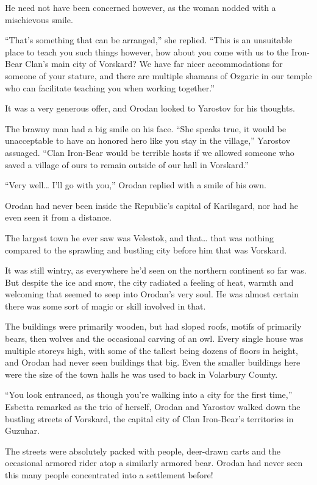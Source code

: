 \documentclass[a4paper,10pt]{book}
\begin{document}
He need not have been concerned however, as the woman nodded with a mischievous smile.\par
“That’s something that can be arranged,” she replied. “This is an unsuitable place to teach you such things however, how about you come with us to the Iron-Bear Clan’s main city of Vorskard? We have far nicer accommodations for someone of your stature, and there are multiple shamans of Ozgaric in our temple who can facilitate teaching you when working together.”\par
It was a very generous offer, and Orodan looked to Yarostov for his thoughts.\par
The brawny man had a big smile on his face. “She speaks true, it would be unacceptable to have an honored hero like you stay in the village,” Yarostov assuaged. “Clan Iron-Bear would be terrible hosts if we allowed someone who saved a village of ours to remain outside of our hall in Vorskard.”\par
“Very well… I’ll go with you,” Orodan replied with a smile of his own.\par
\par
Orodan had never been inside the Republic’s capital of Karilsgard, nor had he even seen it from a distance.\par
The largest town he ever saw was Velestok, and that… that was nothing compared to the sprawling and bustling city before him that was Vorskard.\par
It was still wintry, as everywhere he’d seen on the northern continent so far was. But despite the ice and snow, the city radiated a feeling of heat, warmth and welcoming that seemed to seep into Orodan’s very soul. He was almost certain there was some sort of magic or skill involved in that.\par
The buildings were primarily wooden, but had sloped roofs, motifs of primarily bears, then wolves and the occasional carving of an owl. Every single house was multiple storeys high, with some of the tallest being dozens of floors in height, and Orodan had never seen buildings that big. Even the smaller buildings here were the size of the town halls he was used to back in Volarbury County.\par
“You look entranced, as though you’re walking into a city for the first time,” Esbetta remarked as the trio of herself, Orodan and Yarostov walked down the bustling streets of Vorskard, the capital city of Clan Iron-Bear’s territories in Guzuhar.\par
The streets were absolutely packed with people, deer-drawn carts and the occasional armored rider atop a similarly armored bear. Orodan had never seen this many people concentrated into a settlement before!\par
\end{document}
